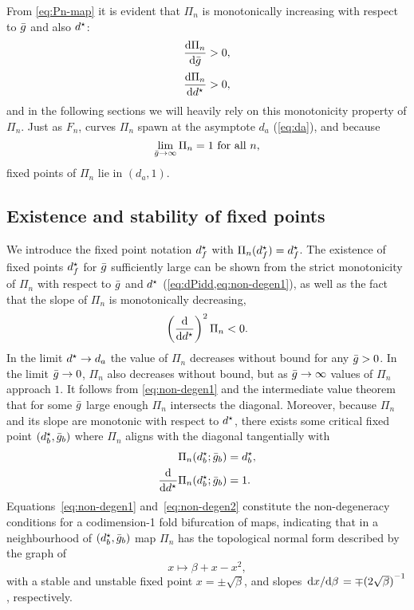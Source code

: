 \documentclass[../manuscript.tex]{subfiles}
\begin{document}
From \cref{eq:Pn-map} it is evident that $\Pi_{n}$ is monotonically increasing with respect to $\bar g$ and also $d^\star$:
\begin{align}
  \label{eq:non-degen1}
  \dv{\Pi_{n}}{\bar g}  & >0, \\[0.5ex]
  \label{eq:dPidd}
  \dv{\Pi_{n}}{d^\star} & >0,
\end{align}
and in the following sections we will heavily rely on this monotonicity property of $\Pi_n$.
Just as $F_{n}$, curves $\Pi_{n}$ spawn at the asymptote $d_{a}$ (\cref{eq:da}), and because
\begin{equation}
  \lim_{\bar g \to \infty}\Pi_{n} = 1\text{ for all }n,
\end{equation}
fixed points of $\Pi_{n}$ lie in $(d_{a}, 1)$.

\subsection{Existence and stability of fixed points}
We introduce the fixed point notation $d^\star_{f}$ with $\Pi_{n}(d^\star_{f})=d^\star_{f}$.
The existence of fixed points $d^\star_{f}$ for $\bar g$ sufficiently large can be shown from the strict monotonicity of $\Pi_{n}$ with respect to $\bar g$ and $d^\star$ (\cref{eq:dPidd,eq:non-degen1}), as well as the fact that the slope of $\Pi_{n}$ is monotonically decreasing,
\begin{equation}
  \label{eq:non-degen2}
  \left(\frac{\mathrm{d}}{\mathrm{d}d^\star}\right)^2 \Pi_{n}<0.
\end{equation}
In the limit $d^\star \to d_{a}$ the value of $\Pi_n$ decreases without bound for any $\bar g>0$.
In the limit $\bar g \to 0$, $\Pi_n$ also decreases without bound, but as $\bar g \to \infty$ values of $\Pi_n$ approach $1$.
It follows from \cref{eq:non-degen1} and the intermediate value theorem that for some $\bar g$ large enough $\Pi_n$ intersects the diagonal.
Moreover, because $\Pi_n$ and its slope are monotonic with respect to $d^\star$, there exists some critical fixed point $(d^\star_b, \bar g_b)$ where $\Pi_n$ aligns with the diagonal tangentially with
\begin{align}
  \Pi_{n}(d^\star_{b}; \bar g_{b})                     & =d^\star_{b}, \\
  \frac{\mathrm{d}}{\mathrm{d} d^\star}\Pi_{n}(d^\star_{b}; \bar g_{b}) & =1.
\end{align}
Equations~\eqref{eq:non-degen1} and~\eqref{eq:non-degen2} constitute the non-degeneracy conditions for a codimension-1 fold bifurcation of maps, indicating that in a neighbourhood of $(d^\star_{b}, \bar g_{b})$ map $\Pi_{n}$ has the topological normal form described by the graph of
\begin{equation}
  \label{eq:normal-form}
  x\mapsto \beta+x-x^{2},
\end{equation}
with a stable and unstable fixed point $x=\pm\sqrt{\beta}$, and slopes $\dv*{x}{\beta}=\mp {(2\sqrt{\beta})}^{-1}$, respectively.
\end{document}
